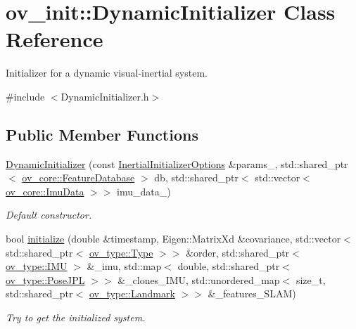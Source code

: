\hypertarget{classov__init_1_1DynamicInitializer}{}\section{ov\+\_\+init\+:\+:Dynamic\+Initializer Class Reference}
\label{classov__init_1_1DynamicInitializer}


Initializer for a dynamic visual-\/inertial system.  




{\ttfamily \#include $<$Dynamic\+Initializer.\+h$>$}

\subsection*{Public Member Functions}
\begin{DoxyCompactItemize}
\item 
\hyperlink{classov__init_1_1DynamicInitializer_a11e592324aedffe4a5b984cf9651a6ab}{Dynamic\+Initializer} (const \hyperlink{structov__init_1_1InertialInitializerOptions}{Inertial\+Initializer\+Options} \&params\+\_\+, std\+::shared\+\_\+ptr$<$ \hyperlink{classov__core_1_1FeatureDatabase}{ov\+\_\+core\+::\+Feature\+Database} $>$ db, std\+::shared\+\_\+ptr$<$ std\+::vector$<$ \hyperlink{structov__core_1_1ImuData}{ov\+\_\+core\+::\+Imu\+Data} $>$$>$ imu\+\_\+data\+\_\+)
\begin{DoxyCompactList}\small\item\em Default constructor. \end{DoxyCompactList}\item 
bool \hyperlink{classov__init_1_1DynamicInitializer_aec51b927083a2c5e6fa0c641ca326504}{initialize} (double \&timestamp, Eigen\+::\+Matrix\+Xd \&covariance, std\+::vector$<$ std\+::shared\+\_\+ptr$<$ \hyperlink{classov__type_1_1Type}{ov\+\_\+type\+::\+Type} $>$$>$ \&order, std\+::shared\+\_\+ptr$<$ \hyperlink{classov__type_1_1IMU}{ov\+\_\+type\+::\+I\+MU} $>$ \&\+\_\+imu, std\+::map$<$ double, std\+::shared\+\_\+ptr$<$ \hyperlink{classov__type_1_1PoseJPL}{ov\+\_\+type\+::\+Pose\+J\+PL} $>$$>$ \&\+\_\+clones\+\_\+\+I\+MU, std\+::unordered\+\_\+map$<$ size\+\_\+t, std\+::shared\+\_\+ptr$<$ \hyperlink{classov__type_1_1Landmark}{ov\+\_\+type\+::\+Landmark} $>$$>$ \&\+\_\+features\+\_\+\+S\+L\+AM)
\begin{DoxyCompactList}\small\item\em Try to get the initialized system. \end{DoxyCompactList}\end{DoxyCompactItemize}


